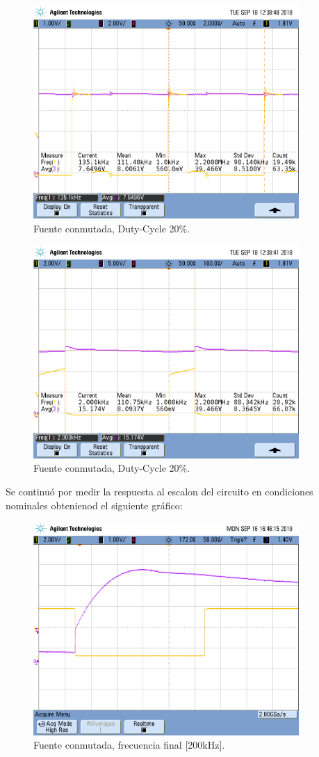 \begin{figure}[H]
	\centering
	\includegraphics[width=0.9\textwidth]{Imagenes/dc_21.png}
\caption{Fuente conmutada, Duty-Cycle 20\%.}
	\label{fig:fcon}
\end{figure}
\begin{figure}[H]
	\centering
	\includegraphics[width=0.9\textwidth]{Imagenes/dc_22.png}
\caption{Fuente conmutada, Duty-Cycle 20\%.}
	\label{fig:fcon}
\end{figure}

Se continuó por medir la respuesta al escalon del circuito en condiciones nominales obtenienod el siguiente gráfico:
\begin{figure}[H]
	\centering
	\includegraphics[width=0.9\textwidth]{Imagenes/tp3_labo7.png}
\caption{Fuente conmutada, frecuencia final [200kHz].}
	\label{fig:fcon}
\end{figure}



